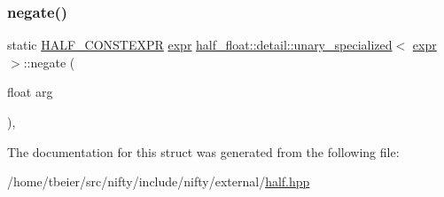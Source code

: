 \mbox{\label{structhalf__float_1_1detail_1_1unary__specialized_3_01expr_01_4_a52fafe72dd5633b391289700c7d41851}} 
\subsubsection{\texorpdfstring{negate()}{negate()}}
{\footnotesize\ttfamily static \hyperlink{half_8hpp_ace3116a3e2cd66dd15780b92060987c7}{H\+A\+L\+F\+\_\+\+C\+O\+N\+S\+T\+E\+X\+PR} \hyperlink{structhalf__float_1_1detail_1_1expr}{expr} \hyperlink{structhalf__float_1_1detail_1_1unary__specialized}{half\+\_\+float\+::detail\+::unary\+\_\+specialized}$<$ \hyperlink{structhalf__float_1_1detail_1_1expr}{expr} $>$\+::negate (\begin{DoxyParamCaption}\item[{float}]{arg }\end{DoxyParamCaption})\hspace{0.3cm}{\ttfamily [inline]}, {\ttfamily [static]}}



The documentation for this struct was generated from the following file\+:\begin{DoxyCompactItemize}
\item 
/home/tbeier/src/nifty/include/nifty/external/\hyperlink{half_8hpp}{half.\+hpp}\end{DoxyCompactItemize}
